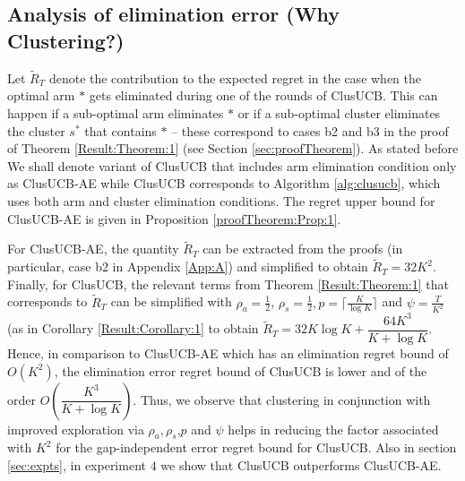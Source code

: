 

\subsection*{Analysis of elimination error (Why Clustering?)}
Let $\widetilde R_T$ denote the contribution  to the expected regret in the case when the optimal arm $*$ gets eliminated during one of the rounds of ClusUCB. This can happen if a sub-optimal arm eliminates $*$ or if a sub-optimal cluster eliminates the cluster $s^*$ that contains $*$ -- these correspond to cases b2 and b3 in the proof of Theorem \ref{Result:Theorem:1} (see Section \ref{sec:proofTheorem}). 
As stated before We shall denote variant of ClusUCB that includes arm elimination condition only as ClusUCB-AE while ClusUCB corresponds to Algorithm \ref{alg:clusucb}, which uses both arm and cluster elimination conditions. The regret upper bound for ClusUCB-AE is given in Proposition \ref{proofTheorem:Prop:1}.

For ClusUCB-AE, the quantity $\widetilde R_T$ can be extracted from the proofs (in particular, case b2 in Appendix \ref{App:A}) and simplified to obtain $\widetilde R_T = 32K^2 $. Finally, for ClusUCB, the relevant terms from Theorem \ref{Result:Theorem:1} that corresponds to $\widetilde R_T$ can be simplified with $\rho_{a}=\frac{1}{2}$, $\rho_{s}=\frac{1}{2},p=\big\lceil \frac{K}{\log K} \big\rceil$ and $\psi=\frac{T}{K^2}$ (as in Corollary \ref{Result:Corollary:1} to obtain  
$\tilde R_T = 32K\log K + \dfrac{64 K^3}{K+\log K}$. Hence, in comparison to ClusUCB-AE which has an elimination regret bound of $O(K^2)$, the elimination error regret bound of ClusUCB is lower and of the order $O(\dfrac{ K^3}{K+\log K})$. Thus, we observe that clustering in conjunction with improved exploration via $\rho_{a},\rho_{s}$,$p$ and $\psi$ helps in reducing the factor associated with $K^2$ for the gap-independent error regret bound for ClusUCB. Also in section \ref{sec:expts}, in experiment $4$ we show that ClusUCB outperforms ClusUCB-AE. 



